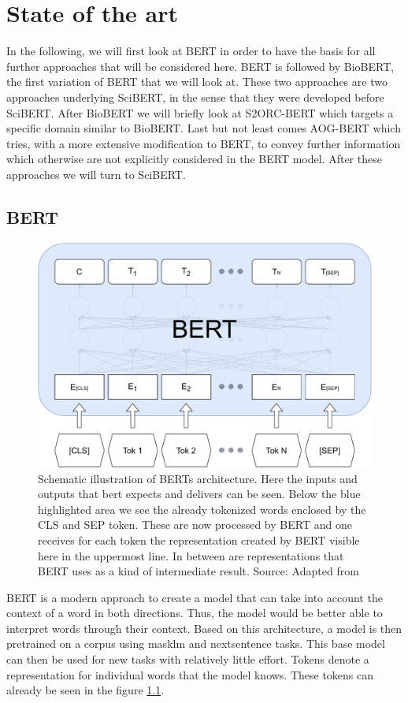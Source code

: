 \chapter{State of the art}
In the following, we will first look at BERT in order to have the basis for all further approaches that will be considered here. BERT is followed by BioBERT, the first variation of BERT that we will look at. These two approaches are two approaches underlying SciBERT, in the sense that they were developed before SciBERT. After BioBERT we will briefly look at S2ORC-BERT which targets a specific domain similar to BioBERT. Last but not least comes AOG-BERT which tries, with a more extensive modification to BERT, to convey further information which otherwise are not explicitly considered in the BERT model. After these approaches we will turn to SciBERT.

\section{BERT}
\begin{figure}[h]
	\includegraphics[width=\linewidth]{src/BERT.pdf}
	\caption{Schematic illustration of BERTs architecture.\newline
	Here the inputs and outputs that bert expects and delivers can be seen. Below the blue highlighted area we see the already tokenized words enclosed by the CLS and SEP token. These are now processed by BERT and one receives for each token the representation created by BERT visible here in the uppermost line. In between are representations that BERT uses as a kind of intermediate result. \newline
	Source: Adapted from \cite{Devlin2018}}
	\label{fig:bert}
\end{figure}
BERT is a modern approach to create a model that can take into account the context of a word in both directions. Thus, the model would be better able to interpret words through their context. Based on this architecture, a model is then pretrained on a corpus using masklm and nextsentence tasks. This base model can then be used for new tasks with relatively little effort. Tokens denote a representation for individual words that the model knows. These tokens can already be seen in the figure \ref{fig:bert}.


